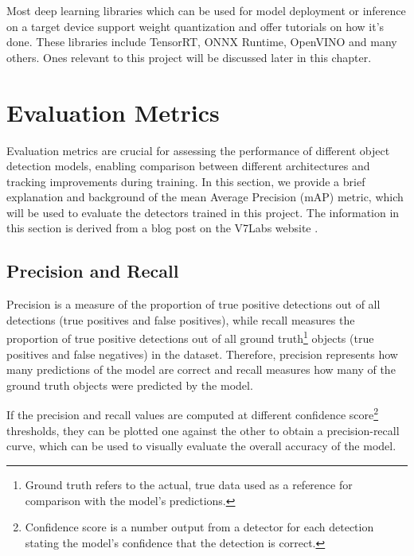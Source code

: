 
Most deep learning libraries which can be used for model deployment or inference
on a target device support weight quantization and offer tutorials on how it's
done. These libraries include TensorRT, ONNX Runtime, OpenVINO and many others.
Ones relevant to this project will be discussed later in this chapter.



\section{Evaluation Metrics}
\label{EvaluationMetrics}

Evaluation metrics are crucial for assessing the performance of different object
detection models, enabling comparison between different architectures and
tracking improvements during training. In this section, we provide a brief
explanation and background of the mean Average Precision (mAP) metric, which
will be used to evaluate the detectors trained in this project. The information
in this section is derived from a blog post on the V7Labs website \cite{mAP}.

\subsection*{Precision and Recall}

Precision is a measure of the proportion of true positive detections out of all
detections (true positives and false positives), while recall measures the
proportion of true positive detections out of all ground truth\footnote{Ground
truth refers to the actual, true data used as a reference for comparison with
the model's predictions.} objects (true positives and false negatives) in the
dataset. Therefore, precision represents how many predictions of the model are
correct and recall measures how many of the ground truth objects were predicted
by the model.

If the precision and recall values are computed at different confidence
score\footnote{Confidence score is a number output from a detector for each
detection stating the model's confidence that the detection is correct.}
thresholds, they can be plotted one against the other to obtain a
precision-recall curve, which can be used to visually evaluate the overall
accuracy of the model.

